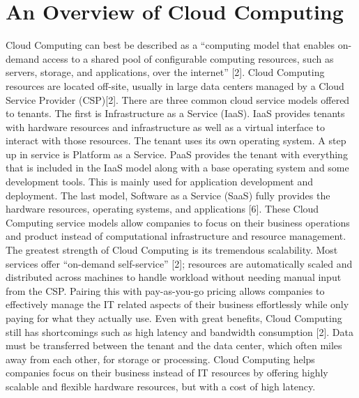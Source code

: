 \documentclass[conference]{IEEEtran}
\begin{document}
\section{An Overview of Cloud Computing}
Cloud Computing can best be described as a “computing model that enables on-demand access to a shared pool of configurable computing resources, such as servers, storage, and applications, over the internet” [2]. Cloud Computing resources are located off-site, usually in large data centers managed by a Cloud Service Provider (CSP)[2]. There are three common cloud service models offered to tenants. The first is Infrastructure as a Service (IaaS). IaaS provides tenants with hardware resources and infrastructure as well as a virtual interface to interact with those resources. The tenant uses its own operating system. A step up in service is Platform as a Service. PaaS provides the tenant with everything that is included in the IaaS model along with a base operating system and some development tools. This is mainly used for application development and deployment. The last model, Software as a Service (SaaS) fully provides the hardware resources, operating systems, and applications [6]. These Cloud Computing service models allow companies to focus on their business operations and product instead of computational infrastructure and resource management.
The greatest strength of Cloud Computing is its tremendous scalability. Most services offer “on-demand self-service” [2]; resources are automatically scaled and distributed across machines to handle workload without needing manual input from the CSP. Pairing this with pay-as-you-go pricing allows companies to effectively manage the IT related aspects of their business effortlessly while only paying for what they actually use. Even with great benefits, Cloud Computing still has shortcomings such as high latency and bandwidth consumption [2]. Data must be transferred between the tenant and the data center, which often miles away from each other, for storage or processing. Cloud Computing helps companies focus on their business instead of IT resources by offering highly scalable and flexible hardware resources, but with a cost of high latency.
\end{document}
